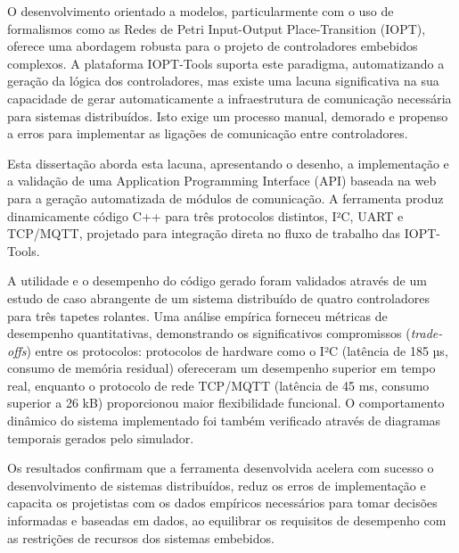 
%


O desenvolvimento orientado a modelos, particularmente com o uso de formalismos como as Redes de Petri Input-Output Place-Transition (IOPT), oferece uma abordagem robusta para o projeto de controladores embebidos complexos. A plataforma IOPT-Tools suporta este paradigma, automatizando a geração da lógica dos controladores, mas existe uma lacuna significativa na sua capacidade de gerar automaticamente a infraestrutura de comunicação necessária para sistemas distribuídos. Isto exige um processo manual, demorado e propenso a erros para implementar as ligações de comunicação entre controladores.

Esta dissertação aborda esta lacuna, apresentando o desenho, a implementação e a validação de uma Application Programming Interface (API) baseada na web para a geração automatizada de módulos de comunicação. A ferramenta produz dinamicamente código C++ para três protocolos distintos, I²C, UART e TCP/MQTT,  projetado para integração direta no fluxo de trabalho das IOPT-Tools.

A utilidade e o desempenho do código gerado foram validados através de um estudo de caso abrangente de um sistema distribuído de quatro controladores para três tapetes rolantes. Uma análise empírica forneceu métricas de desempenho quantitativas, demonstrando os significativos compromissos (\textit{trade-offs}) entre os protocolos: protocolos de hardware como o I²C (latência de 185 µs, consumo de memória residual) ofereceram um desempenho superior em tempo real, enquanto o protocolo de rede TCP/MQTT (latência de 45 ms, consumo superior a 26 kB) proporcionou maior flexibilidade funcional. O comportamento dinâmico do sistema implementado foi também verificado através de diagramas temporais gerados pelo simulador.

Os resultados confirmam que a ferramenta desenvolvida acelera com sucesso o desenvolvimento de sistemas distribuídos, reduz os erros de implementação e capacita os projetistas com os dados empíricos necessários para tomar decisões informadas e baseadas em dados, ao equilibrar os requisitos de desempenho com as restrições de recursos dos sistemas embebidos.
